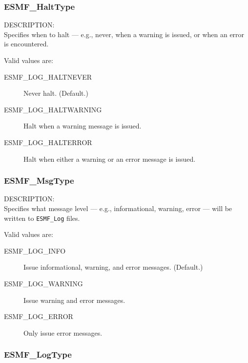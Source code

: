 

\subsubsection{ESMF\_HaltType}

\label{opt:Halttype}
{\sf DESCRIPTION:\\}
Specifies when to halt --- e.g., never, when a warning is issued, or when an
error is encountered.

Valid values are:
\begin{description}
   \item [ESMF\_LOG\_HALTNEVER] 
         Never halt.  (Default.)
   \item [ESMF\_LOG\_HALTWARNING]
         Halt when a warning message is issued.
   \item [ESMF\_LOG\_HALTERROR]
         Halt when either a warning or an error message is issued.
\end{description}

\subsubsection{ESMF\_MsgType}

\label{opt:msgtype}
{\sf DESCRIPTION:\\}
Specifies what message level --- e.g., informational, warning, 
error --- will be written to {\tt ESMF\_Log} files.

Valid values are:
\begin{description}
   \item [ESMF\_LOG\_INFO] 
         Issue informational, warning, and error messages.  (Default.)
   \item [ESMF\_LOG\_WARNING]
         Issue warning and error messages.
   \item [ESMF\_LOG\_ERROR]
         Only issue error messages.
\end{description}

\subsubsection{ESMF\_LogType}

